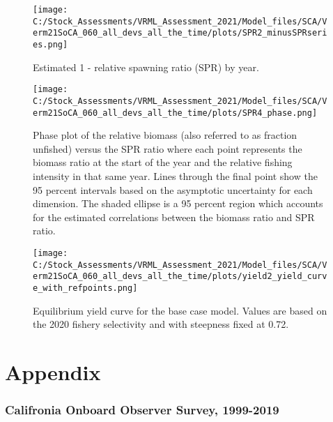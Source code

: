 \documentclass[11pt,
  english,
  a4paper,
]{article}
\begin{document}
\begin{figure}
\centering
\texttt{[image: C:/Stock\_Assessments/VRML\_Assessment\_2021/Model\_files/SCA/Verm21SoCA\_060\_all\_devs\_all\_the\_time/plots/SPR2\_minusSPRseries.png]}
\caption{Estimated 1 - relative spawning ratio (SPR) by year.\label{fig:1-spr}}
\end{figure}

\begin{figure}
\centering
\texttt{[image: C:/Stock\_Assessments/VRML\_Assessment\_2021/Model\_files/SCA/Verm21SoCA\_060\_all\_devs\_all\_the\_time/plots/SPR4\_phase.png]}
\caption{Phase plot of the relative biomass (also referred to as fraction unfished) versus the SPR ratio where each point represents the biomass ratio at the start of the year and the relative fishing intensity in that same year. Lines through the final point show the 95 percent intervals based on the asymptotic uncertainty for each dimension. The shaded ellipse is a 95 percent region which accounts for the estimated correlations between the biomass ratio and SPR ratio.\label{fig:phase}}
\end{figure}

\begin{figure}
\centering
\texttt{[image: C:/Stock\_Assessments/VRML\_Assessment\_2021/Model\_files/SCA/Verm21SoCA\_060\_all\_devs\_all\_the\_time/plots/yield2\_yield\_curve\_with\_refpoints.png]}
\caption{Equilibrium yield curve for the base case model. Values are based on the 2020 fishery selectivity and with steepness fixed at 0.72.\label{fig:yield}}
\end{figure}

\newpage

\clearpage


\hypertarget{appendix}{%
\section{Appendix}\label{appendix}}

\leavevmode\tagmcend\tagstructend


\hypertarget{califronia-onboard-observer-survey-1999-2019}{%
\subsubsection{Califronia Onboard Observer Survey, 1999-2019}\label{califronia-onboard-observer-survey-1999-2019}}
\end{document}
